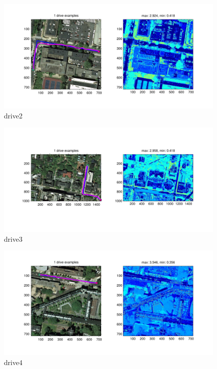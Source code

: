 \documentclass[twoside]{article}
\begin{document}
\begin{multicols}{2}
\begin{figure}[H]
\centering
\includegraphics[width=\columnwidth]{fig/drive2.pdf}
\caption{drive2}
\label{fig:drive2}
\end{figure}

\begin{figure}[H]
\centering
\includegraphics[width=\columnwidth]{fig/drive3.pdf}
\caption{drive3}
\label{fig:drive3}
\end{figure}

\begin{figure}[H]
\centering
\includegraphics[width=\columnwidth]{fig/drive4.pdf}
\caption{drive4}
\label{fig:drive4}
\end{figure}


\end{multicols}
\end{document}
